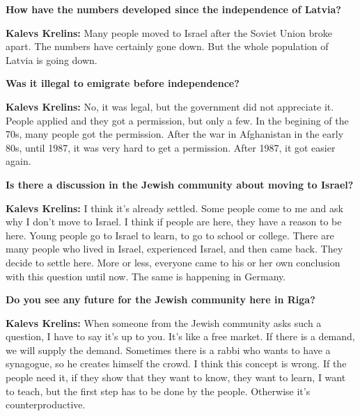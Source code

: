 \textbf{How have the numbers developed since the independence of Latvia?}  

\textbf{Kalevs Krelins:} Many people moved to Israel after the Soviet Union broke apart. The numbers have certainly gone down. But the whole population of Latvia is going down.  

\textbf{Was it illegal to emigrate before independence?} 

\textbf{Kalevs Krelins:} No, it was legal, but the government did not appreciate it. People applied and they got a permission, but only a few. In the begining of the 70s, many people got the permission. After the war in Afghanistan in the early 80s, until 1987, it was very hard to get a permission. After 1987, it got easier again. 

\textbf{Is there a discussion in the Jewish community about moving to Israel?} 

\textbf{Kalevs Krelins:} I think it's already settled. Some people come to me and ask why I don't move to Israel. I think if people are here, they have a reason to be here. Young people go to Israel to learn, to go to school or college. There are many people who lived in Israel, experienced Israel, and then came back. They decide to settle here. More or less, everyone came to his or her own conclusion with this question until now. The same is happening in Germany.  

\textbf{Do you see any future for the Jewish community here in Riga?} 

\textbf{Kalevs Krelins:} When someone from the Jewish community asks such a question, I have to say it’s up to you. It’s like a free market. If there is a demand, we will supply the demand. Sometimes there is a rabbi who wants to have a synagogue, so he creates himself the crowd. I think this concept is wrong. If the people need it, if they show that they want to know, they want to learn, I want to teach, but the first step has to be done by the people. Otherwise it’s counterproductive.  
